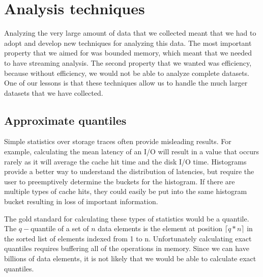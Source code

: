 \section{Analysis techniques}
\label{sec:analysis-techniques}


Analyzing the very large amount of data that we collected meant that
we had to adopt and develop new techniques for analyzing this data.
The most important property that we aimed for was bounded memory,
which meant that we needed to have streaming analysis.  The second
property that we wanted was efficiency, because without efficiency, we
would not be able to analyze complete datasets.  One of our lessons is
that these techniques allow us to handle the much larger datasets that
we have collected.

\subsection{Approximate quantiles}


Simple statistics over storage traces often provide misleading
results.  For example, calculating the mean latency of an I/O will
result in a value that occurs rarely as it will average the cache hit
time and the disk I/O time.  Histograms provide a better way to
understand the distribution of latencies, but require the user to
preemptively determine the buckets for the histogram.  If there are
multiple types of cache hits, they could easily be put into the same
histogram bucket resulting in loss of important information.

The gold standard for calculating these types of statistics would be a
quantile.  The $q-$quantile of a set of $n$ data elements is the
element at position $\lceil q*n\rceil$ in the sorted list of elements
indexed from 1 to n.  Unfortunately calculating exact quantiles
requires buffering all of the operations in memory.  Since we can have
billions of data elements, it is not likely that we would be able to
calculate exact quantiles.

